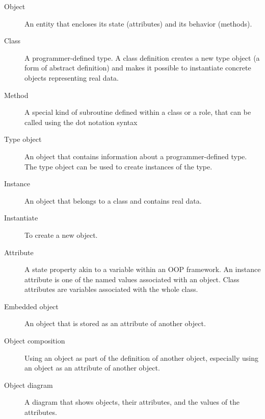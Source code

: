 \begin{description}

\item[Object] An entity that encloses its state (attributes) 
and its behavior (methods).

\item[Class] A programmer-defined type.  A class definition 
creates a new type object (a form of abstract definition) and 
makes it possible to instantiate concrete objects representing 
real data.

\item[Method] A special kind of subroutine defined within a class or a role, that can be called using the dot notation syntax

\item[Type object] An object that contains information about a
programmer-defined type.  The type object can be used to create instances
of the type.

\item[Instance] An object that belongs to a class and contains 
real data.

\item[Instantiate] To create a new object.

\item[Attribute] A state property akin to a variable within 
an OOP framework. An instance attribute is one of the named 
values associated with an object. Class attributes are variables 
associated with the whole class. 

\item[Embedded object] An object that is stored as an attribute
of another object.

\item[Object composition] Using an object as part of the definition 
of another object, especially using an object as an attribute of 
another object.

\item[Object diagram] A diagram that shows objects, their
attributes, and the values of the attributes.


\end{description}
